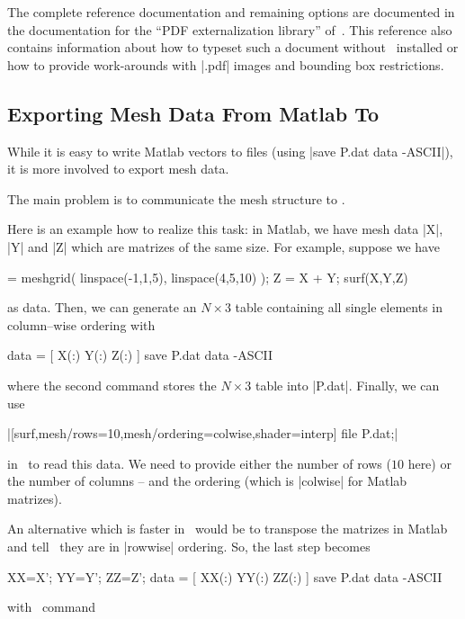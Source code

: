 \begin{pgfgraphicnamed}
The complete reference documentation and remaining options are documented in the documentation for the ``PDF externalization library'' of~\cite{tikz}. This reference also contains information about how to typeset such a document without \pgfname\ installed or how to provide work-arounds with |.pdf| images and bounding box restrictions.

\subsection{Exporting Mesh Data From Matlab To \PGFPlots}
While it is easy to write Matlab vectors to files (using |save P.dat data -ASCII|), it is more involved to export mesh data.

The main problem is to communicate the mesh structure to \PGFPlots.

Here is an example how to realize this task: in Matlab, we have mesh data |X|, |Y| and |Z| which are matrizes of the same size. For example, suppose we have

\begin{codeexample} = meshgrid( linspace(-1,1,5), linspace(4,5,10) );
Z = X + Y;
surf(X,Y,Z)
\end{codeexample}
\noindent as data. Then, we can generate an $N \times 3$ table containing all single elements in column--wise ordering with

\begin{codeexample}
data = [ X(:) Y(:) Z(:) ]
save P.dat data -ASCII
\end{codeexample}
\noindent where the second command stores the $N \times 3$ table into |P.dat|. Finally, we can use 

|[surf,mesh/rows=10,mesh/ordering=colwise,shader=interp] file {P.dat};|

in \PGFPlots\ to read this data. We need to provide either the number of rows ($10$ here) or the number of columns -- and the ordering (which is |colwise| for Matlab matrizes).

An alternative which is faster in \PGFPlots\ would be to transpose the matrizes in Matlab and tell \PGFPlots\ they are in |rowwise| ordering. So, the last step becomes

\begin{codeexample}
XX=X'; YY=Y'; ZZ=Z';
data = [ XX(:) YY(:) ZZ(:) ]
save P.dat data -ASCII
\end{codeexample}
\noindent with \PGFPlots\ command


\end{pgfgraphicnamed}
